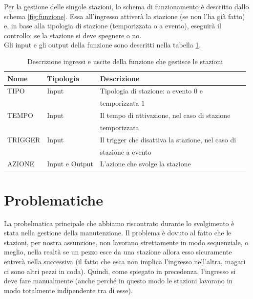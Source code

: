 \documentclass{article}
\begin{document}
Per la gestione delle singole stazioni, lo schema di funzionamento è descritto dallo schema \ref{fig:funzione}. Essa all'ingresso attiverà la stazione (se non l'ha già fatto) e, in base alla tipologia di stazione (temporizzata o a evento), eseguirà il controllo: se la stazione si deve spegnere o no.
\\
Gli input e gli output della funzione sono descritti nella tabella \ref{tab:funzione}.
\begin{table}[H]
    \centering
    \begin{tabular}{l l l l }
        \toprule
        \textbf{Nome} & \textbf{Tipologia} & \textbf{Descrizione}                              \\
        \midrule
        \midrule
        TIPO          & Input              & Tipologia di stazione: a evento 0 e               \\
                      &                    & temporizzata 1                                    \\
        \midrule
        TEMPO         & Input              & Il tempo di attivazione, nel caso di stazione     \\
                      &                    & temporizzata                                      \\
        \midrule
        TRIGGER       & Input              & Il trigger che disattiva la stazione, nel caso di \\
                      &                    & stazione a evento                                 \\
        \midrule
        AZIONE        & Input e Output     & L'azione che svolge la stazione                   \\
        \bottomrule
    \end{tabular}
    \caption{Descrizione ingressi e uscite della funzione che gestisce le stazioni}
    \label{tab:funzione}
\end{table}


\section{Problematiche}
\label{sec:problematiche}
La probelmatica principale che abbiamo riscontrato durante lo svolgimento è stata nella gestione della manutenzione. Il problema è dovuto al fatto che le stazioni, per nostra assunzione, non lavorano strettamente in modo sequenziale, o meglio, nella realtà se un pezzo esce da una stazione allora esso sicuramente entrerà nella successiva (il fatto che esca non implica l'ingresso nell'altra, magari ci sono altri pezzi in coda). Quindi, come spiegato in precedenza, l'ingresso si deve fare manualmente (anche perché in questo modo le stazioni lavorano in modo totalmente indipendente tra di esse).
\\
\end{document}
